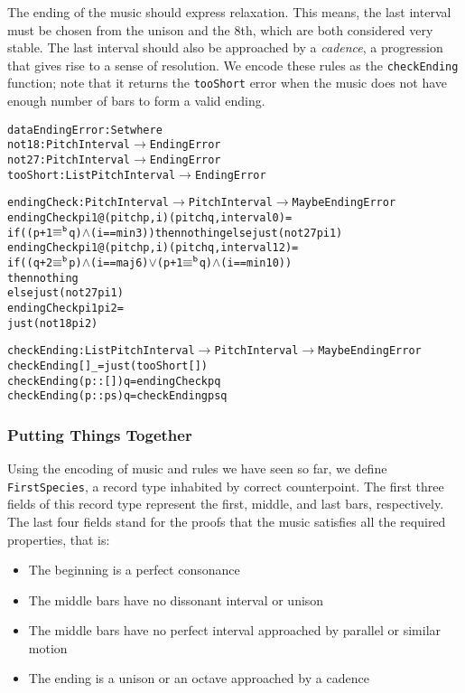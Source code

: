 The ending of the music should express relaxation.
This means, the last interval must be chosen from the unison and
the 8th, which are both considered very stable.
The last interval should also be approached by a \emph{cadence},
a progression that gives rise to a sense of resolution.
We encode these rules as the \texttt{checkEnding} function;
note that it returns the \texttt{tooShort} error when the music does
not have enough number of bars to form a valid ending.

\begin{alltt}
data EndingError : Set where
  not18    : PitchInterval \(\rightarrow\) EndingError
  not27    : PitchInterval \(\rightarrow\) EndingError
  tooShort : List PitchInterval \(\rightarrow\) EndingError

endingCheck : PitchInterval \(\rightarrow\) PitchInterval \(\rightarrow\) Maybe EndingError
endingCheck pi1@(pitch p , i) (pitch q , interval 0)  = 
  if ((p + 1 \(\equiv\sp{\mathtt{b}}\) q) \(\wedge\) (i == min3)) then nothing else just (not27 pi1)
endingCheck pi1@(pitch p , i) (pitch q , interval 12) =
  if ((q + 2 \(\equiv\sp{\mathtt{b}}\) p) \(\wedge\) (i == maj6) \(\vee\) (p + 1 \(\equiv\sp{\mathtt{b}}\) q) \(\wedge\) (i == min10))
  then nothing
  else just (not27 pi1)
endingCheck pi1               pi2                     =
  just (not18 pi2)

checkEnding : List PitchInterval \(\rightarrow\) PitchInterval \(\rightarrow\) Maybe EndingError
checkEnding []        \_ = just (tooShort [])
checkEnding (p :: []) q = endingCheck p q
checkEnding (p :: ps) q = checkEnding ps q
\end{alltt}

\subsubsection{Putting Things Together}

Using the encoding of music and rules we have seen so far,
we define \texttt{FirstSpecies}, a record type inhabited by correct
counterpoint.
The first three fields of this record type represent the first, middle,
and last bars, respectively.
The last four fields stand for the proofs that the music satisfies
all the required properties, that is:

\begin{itemize}
  \item The beginning is a perfect consonance
  \item The middle bars have no dissonant interval or unison
  \item The middle bars have no perfect interval approached by
    parallel or similar motion
  \item The ending is a unison or an octave approached by a cadence
\end{itemize}

